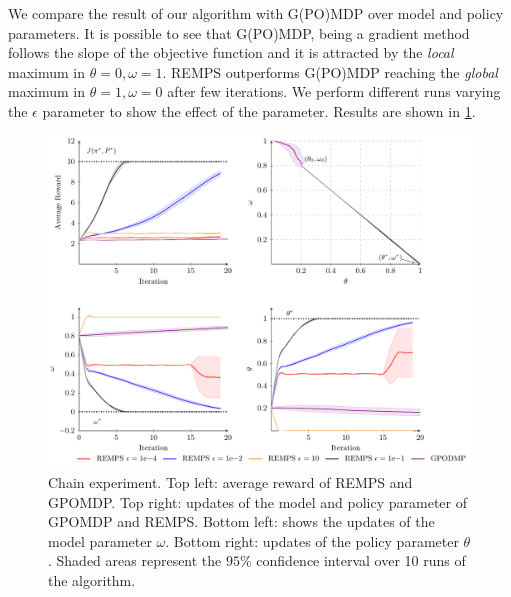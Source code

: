 We compare the result of our algorithm with G(PO)MDP over model and policy parameters.
It is possible to see that G(PO)MDP, being a gradient method follows the slope of the objective function and it is attracted by the \textit{local} maximum in $\theta=0, \omega=1$. REMPS outperforms G(PO)MDP reaching the \textit{global} maximum in $\theta=1, \omega=0$ after few iterations. We perform different runs varying the $\epsilon$ parameter to show the effect of the parameter. Results are shown in \cref{fig:chain-exp}.

\begin{figure}[!tb]
\includegraphics[width=1\textwidth]{plots/chain/plot_chain_all}
\caption{Chain experiment. Top left: average reward of REMPS and GPOMDP. Top right: updates of the model and policy parameter of  GPOMDP and REMPS. Bottom left: shows the updates of the model parameter $\omega$. Bottom right: updates of the policy parameter $\theta$. Shaded areas represent the $95\%$ confidence interval over 10 runs of the algorithm.}
\label{fig:chain-exp}
\end{figure}  

